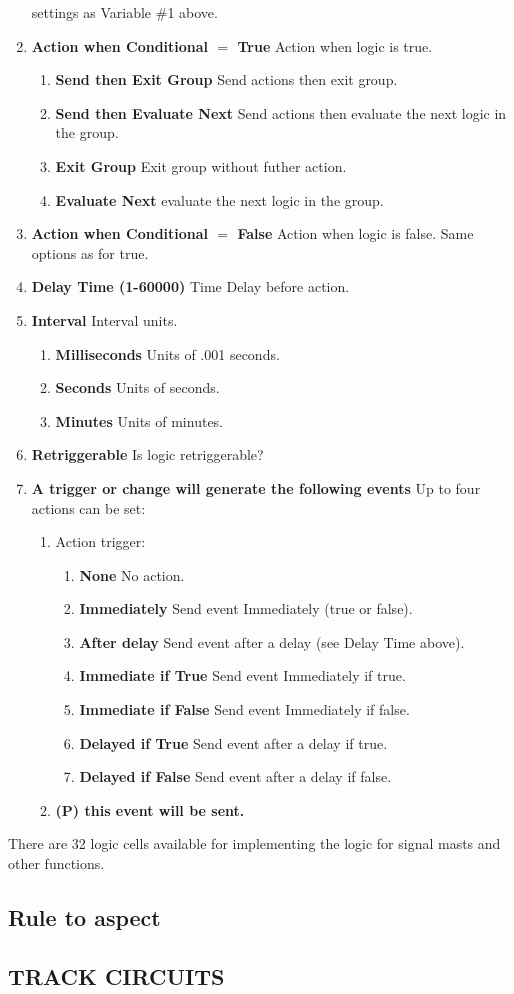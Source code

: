 \begin{enumerate}
settings as Variable \#1 above.
\item \textbf{Action when Conditional $=$ True} Action when logic is true.
\begin{enumerate}
\item \textbf{Send then Exit Group} Send actions then exit group.
\item \textbf{Send then Evaluate Next} Send actions then evaluate the next 
logic in the group.
\item \textbf{Exit Group} Exit group without futher action.
\item \textbf{Evaluate Next} evaluate the next logic in the group.
\end{enumerate}
\item \textbf{Action when Conditional $=$ False} Action when logic is false. 
Same options as for true.
\item \textbf{Delay Time (1-60000)} Time Delay before action.
\item \textbf{Interval} Interval units.
\begin{enumerate}
\item \textbf{Milliseconds} Units of .001 seconds.
\item \textbf{Seconds} Units of seconds.
\item \textbf{Minutes} Units of minutes.
\end{enumerate}
\item \textbf{Retriggerable} Is logic retriggerable?
\item \textbf{A trigger or change will generate the following events} Up to 
four actions can be set:
\begin{enumerate}
\item Action trigger:
\begin{enumerate}
\item \textbf{None} No action.
\item \textbf{Immediately} Send event Immediately (true or false).
\item \textbf{After delay} Send event after a delay (see Delay Time above).
\item \textbf{Immediate if True} Send event Immediately if true.
\item \textbf{Immediate if False} Send event Immediately if false.
\item \textbf{Delayed if True} Send event after a delay if true.
\item \textbf{Delayed if False} Send event after a delay if false.
\end{enumerate}
\item \textbf{(P) this event will be sent.}
\end{enumerate}
\end{enumerate}

There are 32 logic cells available for implementing the logic for signal masts 
and other functions.

\subsection{Rule to aspect}

\subsection{TRACK CIRCUITS}



